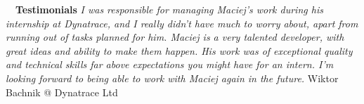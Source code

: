 \documentclass[a4paper, 11pt]{article}
\newcommand{\sectitle}[2]{\large{#1} \ \ \Large{\textbf{#2}}}
\begin{document}
	\begin{section}{\sectitle{\faFile}{Testimonials}}
		\footnotesize{\textit{I was responsible for managing Maciej's work during his internship at Dynatrace, and I really didn't have much to worry about, apart from running out of tasks planned for him. Maciej is a very talented developer, with great ideas and ability to make them happen. His work was of exceptional quality and technical skills far above expectations you might have for an intern. I'm looking forward to being able to work with Maciej again in the future.} \hfill{Wiktor Bachnik @ Dynatrace Ltd}}
	\end{section}
\end{document}
